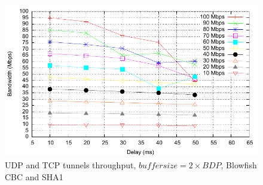 \begin{figure}
  \centering
  \includegraphics[width=\textwidth]{img/test-mptcp-2-crypto}
  \caption{UDP and TCP tunnels throughput, $buffer size = 2 \times BDP$, Blowfish CBC and SHA1}
  \label{fig:mptcp-4}
\end{figure}

